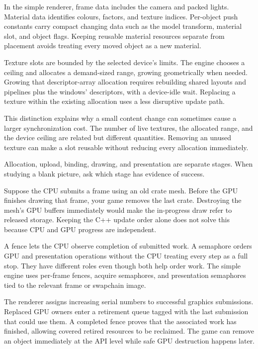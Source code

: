 \documentclass[11pt,a4paper]{article}
\begin{document}
In the simple renderer, frame data includes the camera and packed lights. Material data identifies colours, factors, and texture indices. Per-object push constants carry compact changing data such as the model transform, material slot, and object flags. Keeping reusable material resources separate from placement avoids treating every moved object as a new material.

Texture slots are bounded by the selected device's limits. The engine chooses a ceiling and allocates a demand-sized range, growing geometrically when needed. Growing that descriptor-array allocation requires rebuilding shared layouts and pipelines plus the windows' descriptors, with a device-idle wait. Replacing a texture within the existing allocation uses a less disruptive update path.

This distinction explains why a small content change can sometimes cause a larger synchronization cost. The number of live textures, the allocated range, and the device ceiling are related but different quantities. Removing an unused texture can make a slot reusable without reducing every allocation immediately.

\begin{remember}Allocation, upload, binding, drawing, and presentation are separate stages. When studying a blank picture, ask which stage has evidence of success.\end{remember}

Suppose the CPU submits a frame using an old crate mesh. Before the GPU finishes drawing that frame, your game removes the last crate. Destroying the mesh's GPU buffers immediately would make the in-progress draw refer to released storage. Keeping the C++ update order alone does not solve this because CPU and GPU progress are independent.

A fence lets the CPU observe completion of submitted work. A semaphore orders GPU and presentation operations without the CPU treating every step as a full stop. They have different roles even though both help order work. The simple engine uses per-frame fences, acquire semaphores, and presentation semaphores tied to the relevant frame or swapchain image.

The renderer assigns increasing serial numbers to successful graphics submissions. Replaced GPU owners enter a retirement queue tagged with the last submission that could use them. A completed fence proves that the associated work has finished, allowing covered retired resources to be reclaimed. The game can remove an object immediately at the API level while safe GPU destruction happens later.
\end{document}
